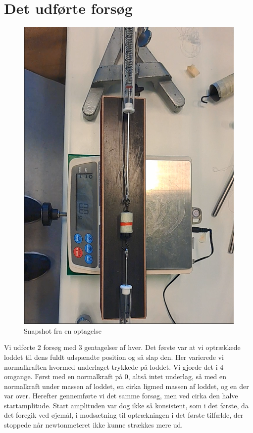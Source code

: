 \section{Det udførte forsøg}
\begin{figure} %
    \centering
    \includegraphics[width=0.65\linewidth,origin=c]{figures/video_eksempel.png}
    \caption{Snapshot fra en optagelse}
    \label{fig:optagelse}
\end{figure}
Vi udførte 2 forsøg med 3 gentagelser af hver. Det første var at vi optrækkede loddet til dens fuldt udspændte position og så slap den. 
Her varierede vi normalkraften hvormed underlaget trykkede på loddet. Vi gjorde det i 4 omgange. Først med en normalkraft på 0, altså intet underlag, så med en normalkraft under massen af loddet, en cirka ligmed massen af loddet, og en der var over.
Herefter gennemførte vi det samme forsøg, men ved cirka den halve startamplitude. Start amplituden var dog ikke så konsistent, som i det første, da det foregik ved øjemål, i modsætning til optrækningen i det første tilfælde, der stoppede når newtonmeteret ikke kunne strækkes mere ud.